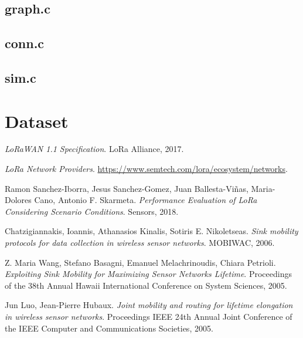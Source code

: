 \documentclass[a4paper,12pt]{article}
\theoremstyle{definition}
\begin{document}
\subsection{graph.c}


\subsection{conn.c}


\subsection{sim.c}


\section{Dataset}

\begin{thebibliography}{0}

\textit{LoRaWAN 1.1 Specification}.
LoRa Alliance, 2017.

\textit{LoRa Network Providers}.
\url{https://www.semtech.com/lora/ecosystem/networks}.

Ramon Sanchez-Iborra, Jesus Sanchez-Gomez, Juan Ballesta-Viñas, Maria-Dolores Cano, Antonio F. Skarmeta.
\textit{Performance Evaluation of LoRa Considering Scenario Conditions}. 
Sensors, 2018.

Chatzigiannakis, Ioannis, Athanasios Kinalis, Sotiris E. Nikoletseas.
\textit{Sink mobility protocols for data collection in wireless sensor networks}.
MOBIWAC, 2006.

Z. Maria Wang, Stefano Basagni, Emanuel Melachrinoudis, Chiara Petrioli.
\textit{Exploiting Sink Mobility for Maximizing Sensor Networks Lifetime}.
Proceedings of the 38th Annual Hawaii International Conference on System Sciences, 2005.

Jun Luo, Jean-Pierre Hubaux.
\textit{Joint mobility and routing for lifetime elongation in wireless sensor networks}.
Proceedings IEEE 24th Annual Joint Conference of the IEEE Computer and Communications Societies, 2005.

\end{thebibliography}
\end{document}
